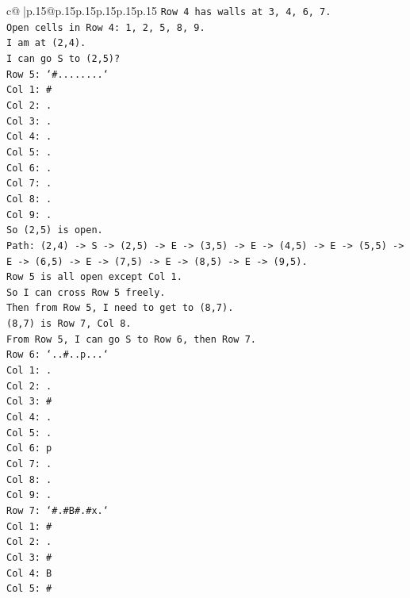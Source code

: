 \documentclass{article}
\begin{document}
{\begin{supertabular}{c@{$\;$}|p{.15\linewidth}@{}p{.15\linewidth}p{.15\linewidth}p{.15\linewidth}p{.15\linewidth}p{.15\linewidth}}
{{{\texttt{Row 4 has walls at 3, 4, 6, 7.} \\
\texttt{Open cells in Row 4: 1, 2, 5, 8, 9.} \\
\texttt{I am at (2,4).} \\
\texttt{I can go S to (2,5)?} \\
\texttt{Row 5: `\#........`} \\
\texttt{Col 1: \#} \\
\texttt{Col 2: .} \\
\texttt{Col 3: .} \\
\texttt{Col 4: .} \\
\texttt{Col 5: .} \\
\texttt{Col 6: .} \\
\texttt{Col 7: .} \\
\texttt{Col 8: .} \\
\texttt{Col 9: .} \\
\texttt{So (2,5) is open.} \\
\texttt{Path: (2,4) {-}> S {-}> (2,5) {-}> E {-}> (3,5) {-}> E {-}> (4,5) {-}> E {-}> (5,5) {-}> E {-}> (6,5) {-}> E {-}> (7,5) {-}> E {-}> (8,5) {-}> E {-}> (9,5).} \\
\texttt{Row 5 is all open except Col 1.} \\
\texttt{So I can cross Row 5 freely.} \\
\texttt{Then from Row 5, I need to get to (8,7).} \\
\texttt{(8,7) is Row 7, Col 8.} \\
\texttt{From Row 5, I can go S to Row 6, then Row 7.} \\
\texttt{Row 6: `..\#..p...`} \\
\texttt{Col 1: .} \\
\texttt{Col 2: .} \\
\texttt{Col 3: \#} \\
\texttt{Col 4: .} \\
\texttt{Col 5: .} \\
\texttt{Col 6: p} \\
\texttt{Col 7: .} \\
\texttt{Col 8: .} \\
\texttt{Col 9: .} \\
\texttt{Row 7: `\#.\#B\#.\#x.`} \\
\texttt{Col 1: \#} \\
\texttt{Col 2: .} \\
\texttt{Col 3: \#} \\
\texttt{Col 4: B} \\
\texttt{Col 5: \#} \\
}}}
\end{supertabular}}
\end{document}
